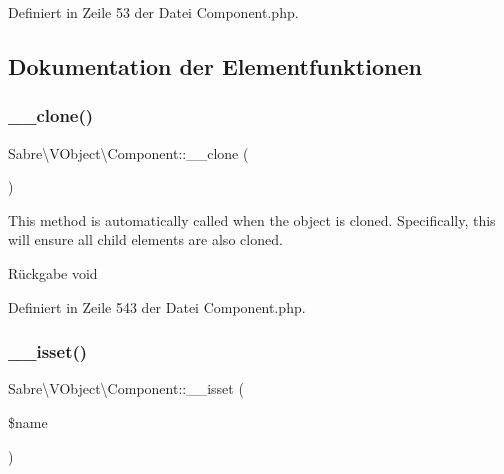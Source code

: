 Definiert in Zeile 53 der Datei Component.\+php.



\subsection{Dokumentation der Elementfunktionen}
\mbox{\label{class_sabre_1_1_v_object_1_1_component_a366cf17ec7cac427403be1a0a8a2e6d7}} 
\subsubsection{\texorpdfstring{\+\_\+\+\_\+clone()}{\_\_clone()}}
{\footnotesize\ttfamily Sabre\textbackslash{}\+V\+Object\textbackslash{}\+Component\+::\+\_\+\+\_\+clone (\begin{DoxyParamCaption}{ }\end{DoxyParamCaption})}

This method is automatically called when the object is cloned. Specifically, this will ensure all child elements are also cloned.

\begin{DoxyReturn}{Rückgabe}
void 
\end{DoxyReturn}


Definiert in Zeile 543 der Datei Component.\+php.

\mbox{\label{class_sabre_1_1_v_object_1_1_component_af87d2d3150a11e3717b468eca24705d0}} 
\subsubsection{\texorpdfstring{\+\_\+\+\_\+isset()}{\_\_isset()}}
{\footnotesize\ttfamily Sabre\textbackslash{}\+V\+Object\textbackslash{}\+Component\+::\+\_\+\+\_\+isset (\begin{DoxyParamCaption}\item[{}]{\$name }\end{DoxyParamCaption})}

